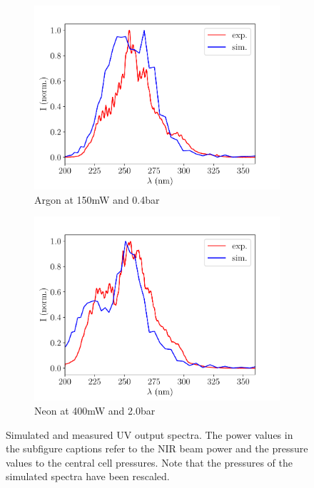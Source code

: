 \documentclass[a4paper]{jpconf}
\begin{document}
\begin{figure}[h]
\centering
 \begin{subfigure}{0.5\textwidth}
\includegraphics[width=\textwidth]{im/spec_comp_Ar_150mw_2.5scale_0.4bar}
\caption{Argon at 150mW and 0.4bar}\label{im:spec_Ar}
\end{subfigure}
 \begin{subfigure}{0.5\textwidth}
\includegraphics[width=\textwidth]{im/spec_comp_Ne_400mw_2.5scale_2.0bar}
\caption{Neon at 400mW and 2.0bar}\label{im:spec_Ne}
\end{subfigure}
\caption{Simulated and measured UV output spectra. The power values in the subfigure captions refer to the NIR beam power and the pressure values to the central cell pressures. Note that the pressures of the simulated spectra have been rescaled.}\label{im:spec}
\end{figure}
\end{document}
